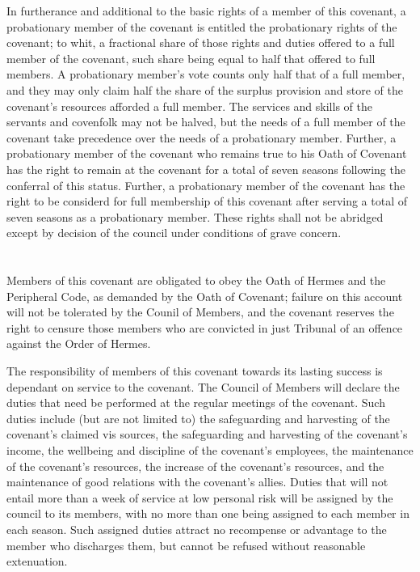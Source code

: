 \documentclass [a3paper,portrait,20pt]{article}
\begin{document}
\begin{multicols}{2}
\begin{small}
	In furtherance and additional to the basic rights of a member of this covenant, a probationary member
	of the covenant is entitled the probationary rights of the covenant; to whit, a fractional share of
	those rights and duties offered to a full member of the covenant, such share being equal to half that
	offered to full members. A probationary member's vote counts only half that of a full member, and they
	may only claim half the share of the surplus provision and store of the covenant's resources afforded a
	full member. The services and skills of the servants and covenfolk may not be halved, but the needs of a
	full member of the covenant take precedence over the needs of a probationary member. Further, a
	probationary member of the covenant who remains true to his Oath of Covenant has the right to remain at
	the covenant for a total of seven seasons following the conferral of this status. Further, a
	probationary member of the covenant has the right to be considerd for full membership of this covenant
	after serving a total of seven seasons as a probationary member. These rights shall not be abridged
	except by decision of the council under conditions of grave concern.
	
\section*{\fontsize{35}{40}\selectfont{Responsibilities of the Members of this Covenant}}
	Members of this covenant are obligated to obey the Oath of Hermes and the Peripheral Code, as demanded
	by the Oath of Covenant; failure on this account will not be tolerated by the Counil of Members, and the
	covenant reserves the right to censure those members who are convicted in just Tribunal of an offence
	against the Order of Hermes.
	
	The responsibility of members of this covenant towards its lasting success is dependant on service to
	the covenant. The Council of Members will declare the duties that need be performed at the regular
	meetings of the covenant. Such duties include (but are not limited to) the safeguarding and harvesting
	of the covenant's claimed vis sources, the safeguarding and harvesting of the covenant's income, the
	wellbeing and discipline of the covenant's employees, the maintenance of the covenant's resources, the
	increase of the covenant's resources, and the maintenance of good relations with the covenant's allies.
	Duties that will not entail more than a week of service at low personal risk will be assigned by the
	council to its members, with no more than one being assigned to each member in each season. Such
	assigned duties attract no recompense or advantage to the member who discharges them, but cannot be
	refused without reasonable extenuation.
	

\end{small}
\end{multicols}
\end{document}
